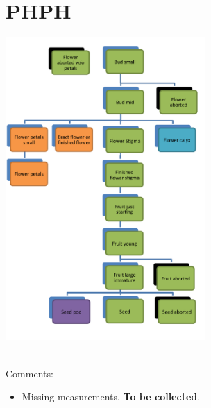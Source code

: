 \documentclass[10pt]{book} %
\begin{document}
\section{PHPH}
\begin{multicols}{2}
\includegraphics[width=3in]{PHPH.png}
\vfill
\columnbreak

\\Comments:
\begin{itemize}
\item Missing measurements. \textbf{To be collected}.
\end{itemize}
\end{multicols}



\clearpage
\newpage
\end{document}
